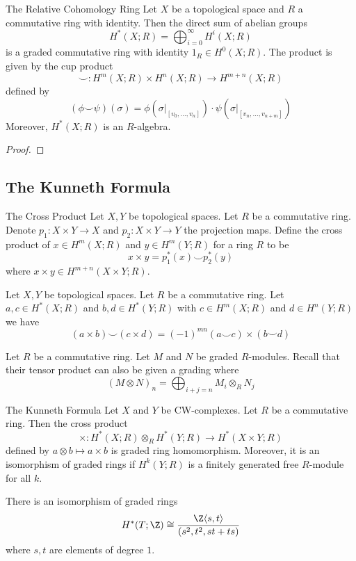 \documentclass[a4paper]{article}
\begin{document}
\begin{thm}{The Relative Cohomology Ring}{} Let $X$ be a topological space and $R$ a commutative ring with identity. Then the direct sum of abelian groups $$H^\ast(X;R)=\bigoplus_{i=0}^\infty H^i(X;R)$$ is a graded commutative ring with identity $1_R\in H^0(X;R)$. The product is given by the cup product $$\smile:H^m(X;R)\times H^n(X;R)\to H^{m+n}(X;R)$$ defined by $$(\phi\smile\psi)(\sigma)=\phi(\sigma|_{[v_0,\dots,v_n]})\cdot\psi(\sigma|_{[v_n,\dots,v_{n+m}]})$$ Moreover, $H^\ast(X;R)$ is an $R$-algebra. 
\begin{proof}
\end{proof}
\end{thm}

\subsection{The Kunneth Formula}
\begin{defn}{The Cross Product}{} Let $X,Y$ be topological spaces. Let $R$ be a commutative ring. Denote $p_1:X\times Y\to X$ and $p_2:X\times Y\to Y$ the projection maps. Define the cross product of $x\in H^m(X;R)$ and $y\in H^m(Y;R)$ for a ring $R$ to be $$x\times y=p_1^\ast(x)\smile p_2^\ast(y)$$ where $x\times y\in H^{m+n}(X\times Y;R)$. 
\end{defn}

\begin{prp}{}{} Let $X,Y$ be topological spaces. Let $R$ be a commutative ring. Let $a,c\in H^\ast(X;R)$ and $b,d\in H^\ast(Y;R)$ with $c\in H^m(X;R)$ and $d\in H^n(Y;R)$ we have $$(a\times b)\smile(c\times d)=(-1)^{mn}(a\smile c)\times(b\smile d)$$
\end{prp}

Let $R$ be a commutative ring. Let $M$ and $N$ be graded $R$-modules. Recall that their tensor product can also be given a grading where $$(M\otimes N)_n=\bigoplus_{i+j=n}M_i\otimes_R N_j$$

\begin{thm}{The Kunneth Formula}{} Let $X$ and $Y$ be CW-complexes. Let $R$ be a commutative ring. Then the cross product $$\times:H^\ast(X;R)\otimes_R H^\ast(Y;R)\to H^\ast(X\times Y;R)$$ defined by $a\otimes b\mapsto a\times b$ is graded ring homomorphism. Moreover, it is an isomorphism of graded rings if $H^k(Y;R)$ is a finitely generated free $R$-module for all $k$. 
\end{thm}

\begin{eg}{}{} There is an isomorphism of graded rings $$H^\ast(T;\Z)\cong\frac{\Z\langle s,t\rangle}{(s^2,t^2,st+ts)}$$ where $s,t$ are elements of degree $1$. 
\end{eg}
\end{document}
